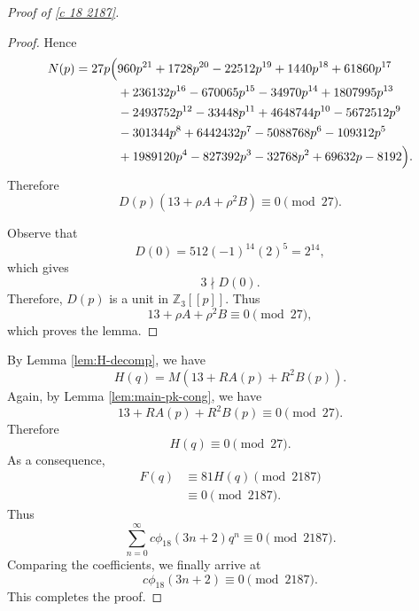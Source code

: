 \documentclass[12pt]{article}
\numberwithin{equation}{section}
\theoremstyle{plain}
\numberwithin{theorem}{section}
\theoremstyle{definition}
\theoremstyle{remark}
\begin{document}
\begin{proof}[Proof of \eqref{c 18 2187}]
\begin{proof}
Hence
\fi
\begin{align*}
N(p)
=
27p\Bigl(
&960p^{21}
+1728p^{20}
-22512p^{19}
+1440p^{18}
+61860p^{17}
\\
&+
236132p^{16}
-670065p^{15}
-34970p^{14}
+1807995p^{13}
\\
&-
2493752p^{12}
-33448p^{11}
+4648744p^{10}
-5672512p^9
\\
&-
301344p^8
+6442432p^7
-5088768p^6
-109312p^5
\\
&+
1989120p^4
-827392p^3
-32768p^2
+69632p
-8192
\Bigr).
\end{align*}
Therefore
\begin{equation*}
D(p)\left(13+\rho A+\rho^2B\right)
\equiv0\pmod{27}.
\end{equation*}

Observe that
\begin{equation*}
D(0)
=
512(-1)^{14}(2)^5
=
2^{14},
\end{equation*}
which gives
\begin{equation*}
3\nmid D(0).
\end{equation*}
Therefore, $D(p)$ is a unit in $\mathbb{Z}_3[[p]]$. Thus
\begin{equation*}
13+\rho A+\rho^2B
\equiv0\pmod{27},
\end{equation*}
which proves the lemma.
\end{proof}

By Lemma \ref{lem:H-decomp}, we have
\begin{equation*}
H(q)
=
M\left(13+RA(p)+R^2B(p)\right).
\end{equation*}
Again, by Lemma \ref{lem:main-pk-cong}, we have
\begin{equation*}
13+RA(p)+R^2B(p)
\equiv0\pmod{27}.
\end{equation*}
Therefore
\begin{equation*}
H(q)\equiv0\pmod{27}.
\end{equation*}
As a consequence,
\begin{align*}
F(q)&\equiv81H(q)\pmod{2187}\\
&\equiv 0\pmod{2187}.
\end{align*}
Thus
\begin{equation*}
\sum_{n=0}^{\infty}
c\phi_{18}(3n+2)q^n
\equiv0\pmod{2187}.
\end{equation*}
Comparing the coefficients, we finally arrive at
\begin{equation*}
c\phi_{18}(3n+2)
\equiv0\pmod{2187}.
\end{equation*}
This completes the proof.
\end{proof}
\end{document}
